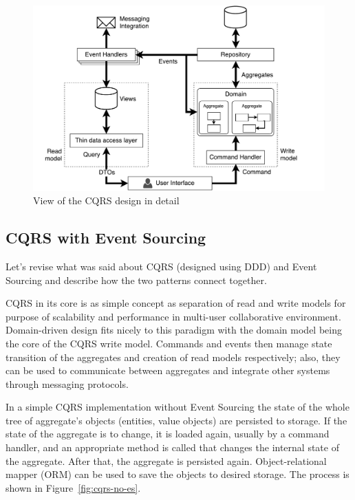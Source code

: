 \documentclass{book}
\begin{document}
\begin{figure}[h!]
\begin{center}
\includegraphics[width=0.95\columnwidth]{figures/cqrs-detail/cqrs-detail}
\caption{View of the CQRS design in detail%
}
\end{center}
\end{figure}

\subsection{CQRS with Event Sourcing}\label{cqrs-with-event-sourcing}

Let's revise what was said about CQRS (designed using DDD) and Event
Sourcing and describe how the two patterns connect together.

CQRS in its core is as simple concept as separation of read and write
models for purpose of scalability and performance in multi-user
collaborative environment. Domain-driven design fits nicely to this
paradigm with the domain model being the core of the CQRS write model.
Commands and events then manage state transition of the aggregates and
creation of read models respectively; also, they can be used to
communicate between aggregates and integrate other systems through
messaging protocols.

In a simple CQRS implementation without Event Sourcing the state of the
whole tree of aggregate's objects (entities, value objects) are
persisted to storage. If the state of the aggregate is to change, it is
loaded again, usually by a command handler, and an appropriate method is
called that changes the internal state of the aggregate. After that, the
aggregate is persisted again. Object-relational mapper (ORM) can be used
to save the objects to desired storage. The process is shown in Figure~\ref{fig:cqrs-no-es}.
\end{document}
